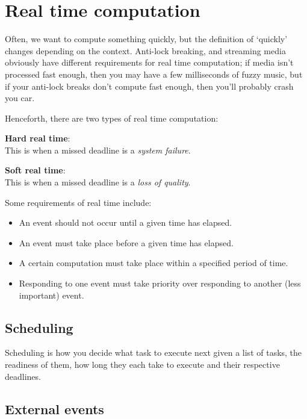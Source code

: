 \section{Real time computation}

Often, we want to compute something quickly, but the definition of `quickly'
changes depending on the context. Anti-lock breaking, and streaming media
obviously have different requirements for real time computation; if media isn't
processed fast enough, then you may have a few milliseconds of fuzzy music, but
if your anti-lock breaks don't compute fast enough, then you'll probably crash
you car.

Henceforth, there are two types of real time computation:

\begin{description}
  \item \textbf{Hard real time}:\\
    This is when a missed deadline is a \textit{system failure}.
  \item \textbf{Soft real time}:\\
    This is when a missed deadline is a \textit{loss of quality}.
\end{description}

Some requirements of real time include:

\begin{mymulticols}
  \begin{itemize}
    \item An event should not occur until a given time has elapsed.
    \item An event must take place before a given time has elapsed.
    \item A certain computation must take place within a specified period of
      time.
    \item Responding to one event must take priority over responding to another
      (less important) event.
  \end{itemize}
\end{mymulticols}

\subsection{Scheduling}

Scheduling is how you decide what task to execute next given a list of tasks,
the readiness of them, how long they each take to execute and their respective
deadlines.

\subsection{External events}

